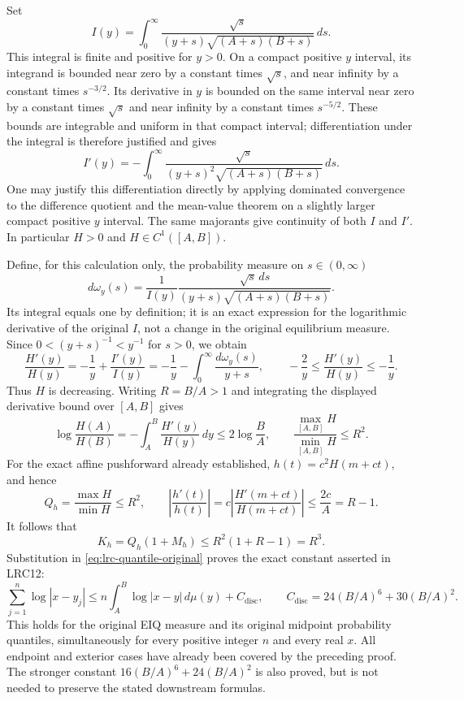 Set
\[
 I(y)=\int_0^\infty
       \frac{\sqrt s}{(y+s)\sqrt{(A+s)(B+s)}}\,ds.
\]
This integral is finite and positive for $y>0$. On a compact
positive $y$ interval, its integrand is bounded near zero by a
constant times $\sqrt s$, and near infinity by a constant times
$s^{-3/2}$. Its derivative in $y$ is bounded on the same interval
near zero by a constant times $\sqrt s$ and near infinity by a
constant times $s^{-5/2}$. These bounds are integrable and uniform
in that compact interval; differentiation under the integral is
therefore justified and gives
\[
 I'(y)=-\int_0^\infty
       \frac{\sqrt s}{(y+s)^2\sqrt{(A+s)(B+s)}}\,ds.
\]
One may justify this differentiation directly by applying dominated
convergence to the difference quotient and the mean-value theorem
on a slightly larger compact positive $y$ interval. The same
majorants give continuity of both $I$ and $I'$. In particular
$H>0$ and $H\in C^1([A,B])$.

Define, for this calculation only, the probability measure on
$s\in(0,\infty)$
\[
 d\omega_y(s)=\frac1{I(y)}
       \frac{\sqrt s\,ds}{(y+s)\sqrt{(A+s)(B+s)}}.
\]
Its integral equals one by definition; it is an exact expression
for the logarithmic derivative of the original $I$, not a change
in the original equilibrium measure. Since $0<(y+s)^{-1}<y^{-1}$
for $s>0$, we obtain
\[
 \frac{H'(y)}{H(y)}
 =-\frac1y+\frac{I'(y)}{I(y)}
 =-\frac1y-\int_0^\infty\frac{d\omega_y(s)}{y+s},
 \qquad
 -\frac2y\leq\frac{H'(y)}{H(y)}\leq-\frac1y.
\]
Thus $H$ is decreasing. Writing $R=B/A>1$ and integrating the
displayed derivative bound over $[A,B]$ gives
\[
 \log\frac{H(A)}{H(B)}
 =-\int_A^B\frac{H'(y)}{H(y)}\,dy
 \leq2\log\frac BA,
 \qquad
 \frac{\max_{[A,B]}H}{\min_{[A,B]}H}\leq R^2.
\]
For the exact affine pushforward already established,
$h(t)=c^2H(m+ct)$, and hence
\[
 Q_h=\frac{\max H}{\min H}\leq R^2,\qquad
 \left|\frac{h'(t)}{h(t)}\right|
 =c\left|\frac{H'(m+ct)}{H(m+ct)}\right|
 \leq\frac{2c}{A}=R-1.
\]
It follows that
\[
 K_h=Q_h(1+M_h)\leq R^2(1+R-1)=R^3.
\]
Substitution in \eqref{eq:lrc-quantile-original} proves the exact
constant asserted in LRC12:
\begin{equation}\label{eq:lrc-eiq-discrepancy}
 \sum_{j=1}^n\log|x-y_j|
 \leq n\int_A^B\log|x-y|\,d\mu(y)
       +C_{\mathrm{disc}},\qquad
 C_{\mathrm{disc}}=24(B/A)^6+30(B/A)^2.
\end{equation}
This holds for the original EIQ measure and its original midpoint
probability quantiles, simultaneously for every positive integer
$n$ and every real $x$. All endpoint and exterior cases have
already been covered by the preceding proof. The stronger constant
$16(B/A)^6+24(B/A)^2$ is also proved, but is not needed to preserve
the stated downstream formulas.

